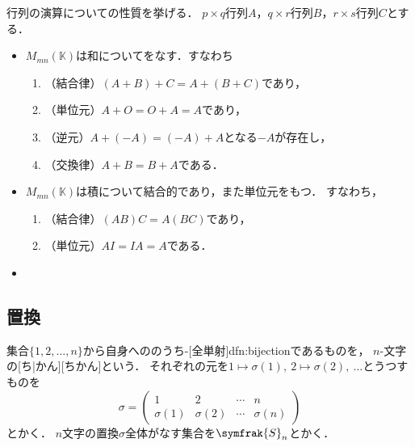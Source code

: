 \documentclass[../sotsu.tex]{subfiles}
\begin{document}
\begin{proposition}
    行列の演算についての性質を挙げる．
    $p \times q$行列$A$，$q \times r$行列$B$，$r \times s$行列$C$とする．
    \begin{itemize}
        \item $M_{mn}(𝕂)$は和についてをなす．すなわち
        \begin{enumerate}
            \item （結合律）$(A + B) + C = A + (B + C)$であり，
            \item （単位元）$A + O = O + A = A$であり，
            \item （逆元）$A + (-A) = (-A) + A$となる$-A$が存在し，
            \item （交換律）$A + B = B + A$である．
        \end{enumerate}
        \item $M_{mn}(𝕂)$は積について結合的であり，また単位元をもつ．
            すなわち，
        \begin{enumerate}
            \item （結合律）$(AB)C = A(BC)$であり，
            \item （単位元）$AI = IA = A$である．
        \end{enumerate}
        \item 
    \end{itemize}
\end{proposition}



\subsection{置換}

\begin{definition}
    \label{dfn:permutation}
    集合$\{ 1, 2, \dots, n \}$から自身へののうち-[全単射]{dfn:bijection}であるものを，
    $n$-文字の[ち|かん][ちかん]という．
    それぞれの元を$1 \mapsto \sigma(1), \  2 \mapsto \sigma(2), \  \dotsc$とうつすものを
    \begin{equation*}
        \sigma = 
        \begin{pmatrix}
                   1  &        2  & \cdots &        n  \\
            \sigma(1) & \sigma(2) & \cdots & \sigma(n)
        \end{pmatrix}
    \end{equation*}
    とかく．
    $n$文字の置換$\sigma$全体がなす集合を$\symfrak{S}_n$とかく．
\end{definition}
\end{document}
